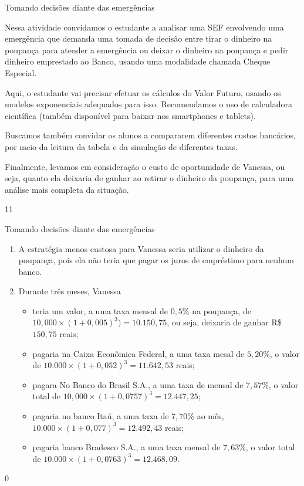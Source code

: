 \begin{sugestions}{Tomando decisões diante das emergências}
{
Nessa atividade convidamos o estudante a analisar uma SEF envolvendo uma emergência que demanda uma tomada de decisão entre tirar o dinheiro na poupança para atender a emergência ou deixar o dinheiro na poupança e pedir dinheiro emprestado ao Banco, usando uma modalidade chamada Cheque Especial.

Aqui, o estudante vai precisar efetuar os cálculos do Valor Futuro, usando os modelos exponenciais adequados para isso. Recomendamos o uso de calculadora científica (também disponível para baixar nos smartphones e tablets). 

Buscamos também convidar os alunos a compararem diferentes custos bancários, por meio da leitura da tabela e da simulação de diferentes taxas.

Finalmente, levamos em consideração o custo de oportunidade de Vanessa, ou seja, quanto ela deixaria de ganhar ao retirar o dinheiro da poupança, para uma análise mais completa da situação. 

}{1}{1}
\end{sugestions}
\begin{answer}{Tomando decisões diante das emergências}
{
  \begin{enumerate}
    \item A estratégia menos custosa para Vanessa seria utilizar o dinheiro da poupança, pois ela não teria que pagar os juros de empréstimo para nenhum banco.
    \item Durante três meses, Vanessa 

    \begin{itemize}
      \item teria um valor, a uma taxa mensal de $0{,}5$\% na poupança, de $10{,}000\times(1+0{,}005)^3) = 10.150{,}75$, ou seja, deixaria de ganhar R\$ $150{,}75$ reais;
      \item pagaria na Caixa Econômica Federal, a uma taxa mesal de $5{,}20\%$, o valor de $10.000\times(1+0{,}052)^3=11.642{,}53$ reais;
      \item pagara No Banco do Brasil S.A., a uma taxa de mensal de $7{,}57$\%, o valor total de $10{,}000\times(1+0{,}0757)^3=12.447{,}25$;
      \item pagaria no banco Itaú, a uma taxa de $7{,}70$\% ao mês, $10.000\times(1+0{,}077)^3=12.492{,}43$ reais;
      \item pagaria banco Bradesco S.A., a uma taxa mensal de $7{,}63$\%, o valor total de $10.000\times(1+0{,}0763)^3=12.468{,}09$.
    \end{itemize}
  \end{enumerate}
}{0}
\end{answer}

